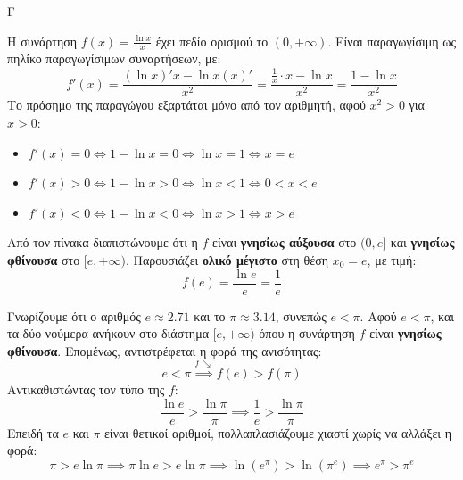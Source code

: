 \begin{thema}{Γ}
\begin{erwthma}
\item Η συνάρτηση $f(x) = \frac{\ln x}{x}$ έχει πεδίο ορισμού το $(0, +\infty)$. Είναι παραγωγίσιμη ως πηλίκο παραγωγίσιμων συναρτήσεων, με:
\[ f'(x) = \frac{(\ln x)' x - \ln x (x)'}{x^2} = \frac{\frac{1}{x} \cdot x - \ln x}{x^2} = \frac{1 - \ln x}{x^2} \]
Το πρόσημο της παραγώγου εξαρτάται μόνο από τον αριθμητή, αφού $x^2 > 0$ για $x > 0$:
\begin{itemize}
    \item $f'(x) = 0 \Leftrightarrow 1 - \ln x = 0 \Leftrightarrow \ln x = 1 \Leftrightarrow x = e$
    \item $f'(x) > 0 \Leftrightarrow 1 - \ln x > 0 \Leftrightarrow \ln x < 1 \Leftrightarrow 0 < x < e$
    \item $f'(x) < 0 \Leftrightarrow 1 - \ln x < 0 \Leftrightarrow \ln x > 1 \Leftrightarrow x > e$
\end{itemize}
\begin{center}
\end{center}
Από τον πίνακα διαπιστώνουμε ότι η $f$ είναι \textbf{γνησίως αύξουσα} στο $(0, e]$ και \textbf{γνησίως φθίνουσα} στο $[e, +\infty)$.
Παρουσιάζει \textbf{ολικό μέγιστο} στη θέση $x_0 = e$, με τιμή:
\[ f(e) = \frac{\ln e}{e} = \frac{1}{e} \]

\item Γνωρίζουμε ότι ο αριθμός $e \approx 2.71$ και το $\pi \approx 3.14$, συνεπώς $e < \pi$.
Αφού $e < \pi$, και τα δύο νούμερα ανήκουν στο διάστημα $[e, +\infty)$ όπου η συνάρτηση $f$ είναι \textbf{γνησίως φθίνουσα}. Επομένως, αντιστρέφεται η φορά της ανισότητας:
\[ e < \pi \overset{f \searrow}{\implies} f(e) > f(\pi) \]
Αντικαθιστώντας τον τύπο της $f$:
\[ \frac{\ln e}{e} > \frac{\ln \pi}{\pi} \implies \frac{1}{e} > \frac{\ln \pi}{\pi} \]
Επειδή τα $e$ και $\pi$ είναι θετικοί αριθμοί, πολλαπλασιάζουμε χιαστί χωρίς να αλλάξει η φορά:
\[ \pi > e \ln \pi \implies \pi \ln e > e \ln \pi \implies \ln(e^\pi) > \ln(\pi^e) \implies e^\pi > \pi^e \]


\end{erwthma}
\end{thema}
